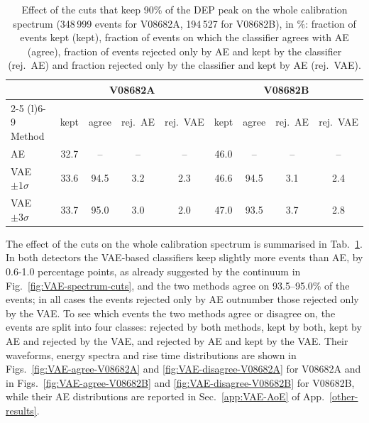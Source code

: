 \begin{table}[H]
    \centering
    \setlength{\tabcolsep}{5pt}
    \begin{tabular}{lcccccccc}
        \toprule
        & \multicolumn{4}{c}{V08682A} & \multicolumn{4}{c}{V08682B} \\
        \cmidrule(lr){2-5} \cmidrule(l){6-9}
        Method & kept & agree & rej.~\acs{AE} & rej.~\acs{VAE} & kept & agree & rej.~\acs{AE} & rej.~\acs{VAE} \\
        \midrule
        \acs{AE}               & 32.7 &  --  &  -- & --  & 46.0 & --   & --  & --  \\
        \acs{VAE} $\pm1\sigma$ & 33.6 & 94.5 & 3.2 & 2.3 & 46.6 & 94.5 & 3.1 & 2.4 \\
        \acs{VAE} $\pm3\sigma$ & 33.7 & 95.0 & 3.0 & 2.0 & 47.0 & 93.5 & 3.7 & 2.8 \\
        \bottomrule
    \end{tabular}
    \caption{Effect of the cuts that keep 90\% of the \ac{DEP} peak on the whole calibration spectrum (348\,999 events for V08682A, 194\,527 for V08682B), in \%: fraction of events kept (kept), fraction of events on which the classifier agrees with \ac{AE} (agree), fraction of events rejected only by \ac{AE} and kept by the classifier (rej.~\acs{AE}) and fraction rejected only by the classifier and kept by \ac{AE} (rej.~\acs{VAE}).}
    \label{tab:VAE-agreement}
\end{table}

The effect of the cuts on the whole calibration spectrum is summarised in Tab.~\ref{tab:VAE-agreement}. In both detectors the \ac{VAE}-based classifiers keep slightly more events than \ac{AE}, by 0.6-1.0 percentage points, as already suggested by the continuum in Fig.~\ref{fig:VAE-spectrum-cuts}, and the two methods agree on 93.5--95.0\% of the events; in all cases the events rejected only by \ac{AE} outnumber those rejected only by the \ac{VAE}. To see which events the two methods agree or disagree on, the events are split into four classes: rejected by both methods, kept by both, kept by \ac{AE} and rejected by the \ac{VAE}, and rejected by \ac{AE} and kept by the \ac{VAE}. Their waveforms, energy spectra and rise time distributions are shown in Figs.~\ref{fig:VAE-agree-V08682A} and \ref{fig:VAE-disagree-V08682A} for V08682A and in Figs.~\ref{fig:VAE-agree-V08682B} and \ref{fig:VAE-disagree-V08682B} for V08682B, while their \ac{AE} distributions are reported in Sec.~\ref{app:VAE-AoE} of App.~\ref{other-results}.

